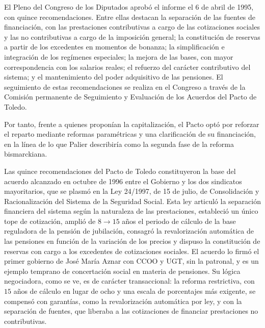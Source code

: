 \documentclass[10pt,a4paper]{article}
\begin{document}
El Pleno del Congreso de los Diputados aprobó el informe el 6 de abril de 1995, con quince recomendaciones. Entre ellas destacan la separación de las fuentes de financiación, con las prestaciones contributivas a cargo de las cotizaciones sociales y las no contributivas a cargo de la imposición general; la constitución de reservas a partir de los excedentes en momentos de bonanza; la simplificación e integración de los regímenes especiales; la mejora de las bases, con mayor correspondencia con los salarios reales; el refuerzo del carácter contributivo del sistema; y el mantenimiento del poder adquisitivo de las pensiones. El seguimiento de estas recomendaciones se realiza en el Congreso a través de la Comisión permanente de Seguimiento y Evaluación de los Acuerdos del Pacto de Toledo.

Por tanto, frente a quienes proponían la capitalización, el Pacto optó por reforzar el reparto mediante reformas paramétricas y una clarificación de su financiación, en la línea de lo que Palier describiría como la segunda fase de la reforma bismarckiana.

Las quince recomendaciones del Pacto de Toledo constituyeron la base del acuerdo alcanzado en octubre de 1996 entre el Gobierno y los dos sindicatos mayoritarios, que se plasmó en la Ley 24/1997, de 15 de julio, de Consolidación y Racionalización del Sistema de la Seguridad Social. Esta ley articuló la separación financiera del sistema según la naturaleza de las prestaciones, estableció un único tope de cotización, amplió de $8\to 15$ años el periodo de cálculo de la base reguladora de la pensión de jubilación, consagró la revalorización automática de las pensiones en función de la variación de los precios y dispuso la constitución de reservas con cargo a los excedentes de cotizaciones sociales. El acuerdo lo firmó el primer gobierno de José María Aznar con CCOO y UGT, sin la patronal, y es un ejemplo temprano de concertación social en materia de pensiones. Su lógica negociadora, como se ve, es de carácter transaccional: la reforma restrictiva, con $15$ años de cálculo en lugar de ocho y una escala de porcentajes más exigente, se compensó con garantías, como la revalorización automática por ley, y con la separación de fuentes, que liberaba a las cotizaciones de financiar prestaciones no contributivas. 
\end{document}
